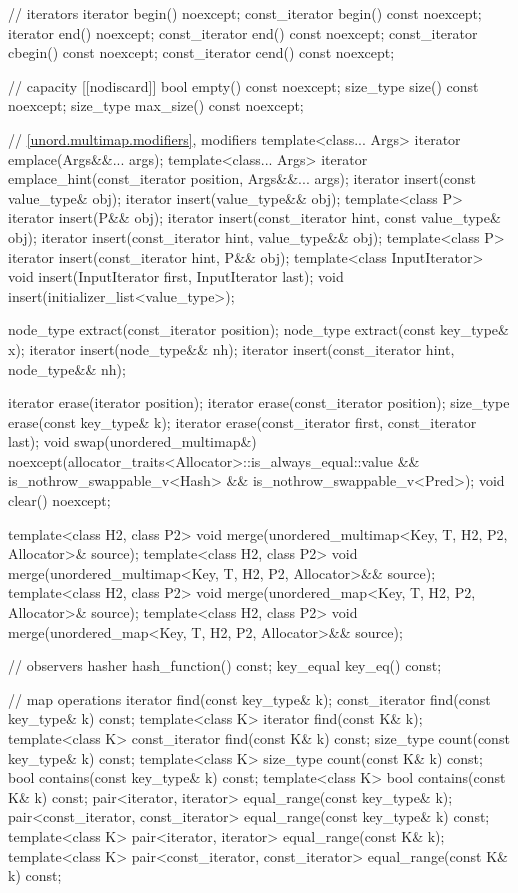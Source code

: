 \begin{codeblock}
{{    // iterators
    iterator       begin() noexcept;
    const_iterator begin() const noexcept;
    iterator       end() noexcept;
    const_iterator end() const noexcept;
    const_iterator cbegin() const noexcept;
    const_iterator cend() const noexcept;

    // capacity
    [[nodiscard]] bool empty() const noexcept;
    size_type size() const noexcept;
    size_type max_size() const noexcept;

    // \ref{unord.multimap.modifiers}, modifiers
    template<class... Args> iterator emplace(Args&&... args);
    template<class... Args> iterator emplace_hint(const_iterator position, Args&&... args);
    iterator insert(const value_type& obj);
    iterator insert(value_type&& obj);
    template<class P> iterator insert(P&& obj);
    iterator insert(const_iterator hint, const value_type& obj);
    iterator insert(const_iterator hint, value_type&& obj);
    template<class P> iterator insert(const_iterator hint, P&& obj);
    template<class InputIterator> void insert(InputIterator first, InputIterator last);
    void insert(initializer_list<value_type>);

    node_type extract(const_iterator position);
    node_type extract(const key_type& x);
    iterator insert(node_type&& nh);
    iterator insert(const_iterator hint, node_type&& nh);

    iterator  erase(iterator position);
    iterator  erase(const_iterator position);
    size_type erase(const key_type& k);
    iterator  erase(const_iterator first, const_iterator last);
    void      swap(unordered_multimap&)
      noexcept(allocator_traits<Allocator>::is_always_equal::value &&
               is_nothrow_swappable_v<Hash> &&
               is_nothrow_swappable_v<Pred>);
    void      clear() noexcept;

    template<class H2, class P2>
      void merge(unordered_multimap<Key, T, H2, P2, Allocator>& source);
    template<class H2, class P2>
      void merge(unordered_multimap<Key, T, H2, P2, Allocator>&& source);
    template<class H2, class P2>
      void merge(unordered_map<Key, T, H2, P2, Allocator>& source);
    template<class H2, class P2>
      void merge(unordered_map<Key, T, H2, P2, Allocator>&& source);

    // observers
    hasher hash_function() const;
    key_equal key_eq() const;

    // map operations
    iterator         find(const key_type& k);
    const_iterator   find(const key_type& k) const;
    template<class K>
      iterator       find(const K& k);
    template<class K>
      const_iterator find(const K& k) const;
    size_type        count(const key_type& k) const;
    template<class K>
      size_type      count(const K& k) const;
    bool             contains(const key_type& k) const;
    template<class K>
      bool           contains(const K& k) const;
    pair<iterator, iterator>               equal_range(const key_type& k);
    pair<const_iterator, const_iterator>   equal_range(const key_type& k) const;
    template<class K>
      pair<iterator, iterator>             equal_range(const K& k);
    template<class K>
      pair<const_iterator, const_iterator> equal_range(const K& k) const;

}}
\end{codeblock}
